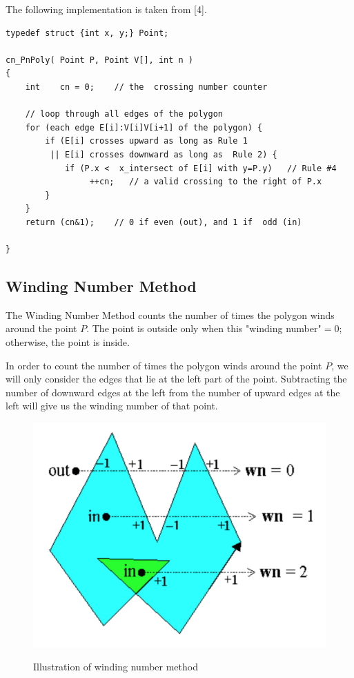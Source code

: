 \documentclass[12pt]{article}
\begin{document}
The following implementation is taken from [4].
\begin{lstlisting}
typedef struct {int x, y;} Point;

cn_PnPoly( Point P, Point V[], int n )
{
    int    cn = 0;    // the  crossing number counter

    // loop through all edges of the polygon
    for (each edge E[i]:V[i]V[i+1] of the polygon) {
        if (E[i] crosses upward as long as Rule 1
         || E[i] crosses downward as long as  Rule 2) {
            if (P.x <  x_intersect of E[i] with y=P.y)   // Rule #4
                 ++cn;   // a valid crossing to the right of P.x
        }
    }
    return (cn&1);    // 0 if even (out), and 1 if  odd (in)

}
\end{lstlisting}

\subsection{Winding Number Method}

The Winding Number Method counts the number of times the polygon winds around 
the point $P$. The point is outside only when this "winding number"$=0$; otherwise, 
the point is inside.

In order to count the number of times the polygon winds around the point $P$, we
will only consider the edges that lie at the left part of the point. 
Subtracting the number of downward edges at the left from the number of upward 
edges at the left will give us the winding number of that point.

\begin{center}
  \begin{figure}[!htb]
    \centering
    \includegraphics[width=.5\linewidth]{figures/fig12.png}
    \label{fig:13}
    \caption{Illustration of winding number method}
  \end{figure}
\end{center}
\end{document}
